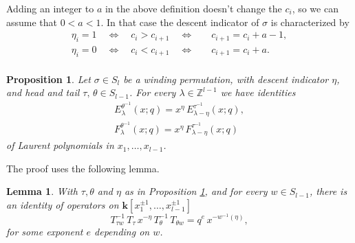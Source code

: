 \documentclass[12pt]{amsart}
\newtheorem{lemma}[thm]{Lemma}
\newtheorem{prop}[thm]{Proposition}
\theoremstyle{definition}
\theoremstyle{remark}
\newcommand{\ZZ}{{\mathbb Z}}
\newcommand{\kk}{{\mathbf k}}
\begin{document}
Adding an integer to $a$ in the above definition doesn't change the
$c_{i}$, so we can assume that $0<a<1$.  In that case the descent
indicator of $\sigma $ is characterized by
\begin{equation}\label{e:winding-descents}
\begin{aligned}
\eta _{i} = 1\quad \Leftrightarrow \quad c_{i}>c_{i+1}\quad
\Leftrightarrow \quad & c_{i+1} = c_{i}+a-1,\\
\eta _{i} = 0\quad \Leftrightarrow \quad c_{i}<c_{i+1}\quad
\Leftrightarrow\quad & c_{i+1} = c_{i}+a.\\
\end{aligned}
\end{equation}

\begin{prop}\label{prop:winding}
Let $\sigma \in S_{l}$ be a winding permutation, with descent
indicator $\eta $, and head and tail $\tau ,\, \theta \in S_{l-1}$.
For every $\lambda \in \ZZ ^{l-1}$ we have identities 
\begin{gather}\label{e:winding-1}
E^{\theta ^{-1}}_{\lambda }(x;q) = x^{\eta }\, E^{\tau ^{-1}}_{\lambda
-\eta }(x;q),\\
\label{e:winding-2}
F^{\theta ^{-1}}_{\lambda }(x;q) = x^{\eta }\, F^{\tau ^{-1}}_{\lambda
-\eta }(x;q)
\end{gather}
of Laurent polynomials in $x_{1},\ldots,x_{l-1}$.
\end{prop}

The proof uses the following lemma.

\begin{lemma}\label{lem:winding}
With $\tau ,\theta $ and $\eta $ as in Proposition \ref{prop:winding},
and for every $w\in S_{l-1}$, there is an identity of operators on
$\kk[x_{1}^{\pm 1},\ldots,x_{l-1}^{\pm 1}]$
\begin{equation}\label{e:Hecke-winding}
T_{\tau w}^{-1}\, T_{\tau }\, x^{-\eta }\, T_{\theta }^{-1}\,
T_{\theta w} = q^{e}\, x^{-w^{-1}(\eta )},
\end{equation}
for some exponent $e$ depending on $w$.
\end{lemma}
\end{document}
